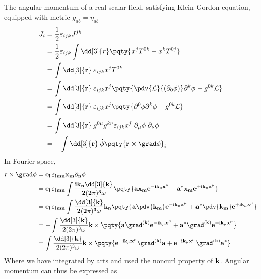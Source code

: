 \documentclass[12pt]{article}
\begin{document}
        \subsection{} The angular momentum of a real scalar field, satisfying Klein-Gordon equation, equipped with metric \(g_{ab} = \eta_{ab}\){\begin{align*}
            J_i &= \frac{1}{2}\varepsilon_{ijk} J^{jk}\\
            &= \frac{1}{2}\varepsilon_{ijk} \int \dd[3]{r} \pqty{x^j T^{0k} - x^k T^{0j}}\\
            &= \int \dd[3]{\bf r}\: \varepsilon_{ijk} x^j T^{0k}\\
            &= \int \dd[3]{\bf r}\: \varepsilon_{ijk} x^j \pqty{\pdv{\mathcal{L}}{(\partial_0\phi)}\partial^k\phi - g^{0k}\mathcal{L}}\\
            &= \int \dd[3]{\bf r}\: \varepsilon_{ijk} x^j \pqty{\partial^0 \phi \partial^k\phi - g^{0k}\mathcal{L}}\\
            &= \int \dd[3]{\bf r}\: g^{0\mu}g^{k\nu}\varepsilon_{ijk} x^j \; \partial_\mu\phi\;  \partial_\nu\phi\\
            &= - \int \dd[3]{\bf r}\: \dot{\phi} \pqty{\bf r \times \grad \phi}_i
        \end{align*}}
        In Fourier space, \begin{align*}
            r \times \grad \phi &= \bf e_l\, \varepsilon_{lmn} x_m \partial_n \phi\\
            &= \bf e_l\, \varepsilon_{lmn} \int \frac{i k_n \dd[3]{\bf k}}{2 (2\pi)^3 \omega }\pqty{a x_m e^{ - ik_\mu x^\mu} - a^* x_m e^{ + i k_\mu x^\mu}}\\
            &= \bf e_l\, \varepsilon_{lmn} \int \frac{\dd[3]{\bf k}}{2 (2\pi)^3 \omega } k_n \pqty{a\pdv{k_m}e^{ - ik_\mu x^\mu} + a^* \pdv{k_m}e^{ + i k_\mu x^\mu}}\\
            &= - \int \frac{\dd[3]{\bf k}}{2 (2\pi)^3 \omega } \bf k \times \pqty{a\grad^{(\bf k)}e^{ - ik_\mu x^\mu} + a^*\grad^{(\bf k)}e^{ + i k_\mu x^\mu}}\\
            &= \int \frac{\dd[3]{\bf k}}{2 (2\pi)^3 \omega } \bf k \times \pqty{e^{ - ik_\mu x^\mu} \grad^{(\bf k)}a+ e^{ + i k_\mu x^\mu}\grad^{(\bf k)}a^*}\\
        \end{align*}
        Where we have integrated by arts and used the noncurl property of \(\bf k\). Angular momentum can thus be expressed as
\end{document}
